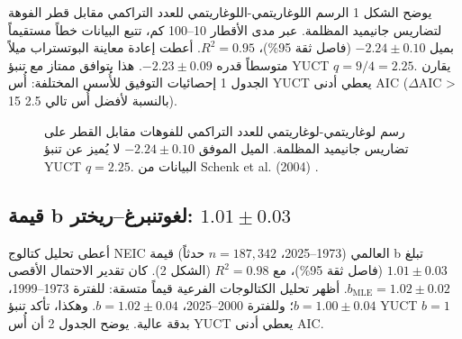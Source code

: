 \documentclass[11pt,a4paper]{article}
\begin{document}
	يوضح الشكل 1 الرسم اللوغاريتمي-اللوغاريتمي للعدد التراكمي مقابل قطر الفوهة لتضاريس جانيميد المظلمة. عبر مدى الأقطار 10–100 كم، تتبع البيانات خطاً مستقيماً بميل \(-2.24 \pm 0.10\) (فاصل ثقة 95\%)، \(R^2 = 0.95\). أعطت إعادة معاينة البوتستراب ميلاً متوسطاً قدره \(-2.23 \pm 0.09\). هذا بتوافق ممتاز مع تنبؤ YUCT \(q = 9/4 = 2.25\). يقارن الجدول 1 إحصائيات التوفيق للأُسس المختلفة: أُس YUCT يعطي أدنى AIC (\(\Delta\)AIC > 15 بالنسبة لأفضل أُس تالي 2.5).
	
	\begin{otherlanguage}{english}
		\begin{figure}[htbp]
			\centering
			\caption{رسم لوغاريتمي-لوغاريتمي للعدد التراكمي للفوهات مقابل القطر على تضاريس جانيميد المظلمة. الميل الموفق \(-2.24 \pm 0.10\) لا يُميز عن تنبؤ YUCT \(q = 2.25\). البيانات من Schenk et al. (2004) \cite{Schenk2004}.}
			\label{fig:craters}
		\end{figure}
	\end{otherlanguage}
	
	\subsection{قيمة b لغوتنبرغ–ريختر: \(1.01 \pm 0.03\)}
	
	أعطى تحليل كتالوج NEIC العالمي (1973–2025، \(n = 187,342\) حدثاً) قيمة b تبلغ \(1.01 \pm 0.03\) (فاصل ثقة 95\%)، مع \(R^2 = 0.98\) (الشكل 2). كان تقدير الاحتمال الأقصى \(b_{\text{MLE}} = 1.02 \pm 0.02\). أظهر تحليل الكتالوجات الفرعية قيماً متسقة: للفترة 1973–1999، \(b = 1.00 \pm 0.04\)؛ وللفترة 2000–2025، \(b = 1.02 \pm 0.04\). وهكذا، تأكد تنبؤ YUCT \(b = 1\) بدقة عالية. يوضح الجدول 2 أن أُس YUCT يعطي أدنى AIC.
	
\end{document}
